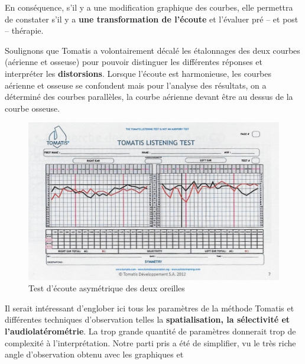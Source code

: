  En  conséquence,  s'il y a une modification
          graphique des courbes, elle
          permettra de constater s'il y a \textbf{une transformation de l'écoute}
          et l'évaluer pré -- et
          post -- thérapie.




Soulignons que Tomatis a volontairement décalé les étalonnages des deux courbes (aérienne et osseuse) pour pouvoir distinguer les différentes réponses et interpréter
	les \textbf{distorsions}. Lorsque l'écoute est harmonieuse, les
	courbes aérienne et osseuse se confondent mais pour l'analyse des
	résultats, on a déterminé des courbes parallèles, la courbe aérienne
	devant être au dessus de la courbe osseuse.


\begin{figure}
	\centering
	\includegraphics[width=1\linewidth]{images/tomatisListeningTest.jpg}
	\caption[Test d'écoute]{Test
          d'écoute asymétrique des deux oreilles}
	\label{Test d'écoute asymétrique avec oreille droite et oreille gauche}
\end{figure}
 Il serait intéressant d'englober ici tous les paramètres de la méthode Tomatis et différentes techniques 
 d'observation telles la \textbf{spatialisation, la sélectivité et l'audiolatérométrie}. La trop grande quantité 
 de paramètres donnerait  trop de complexité
  à l'interprétation. Notre parti pris a été de simplifier, vu le très riche angle d'observation obtenu avec les 
  graphiques et 
